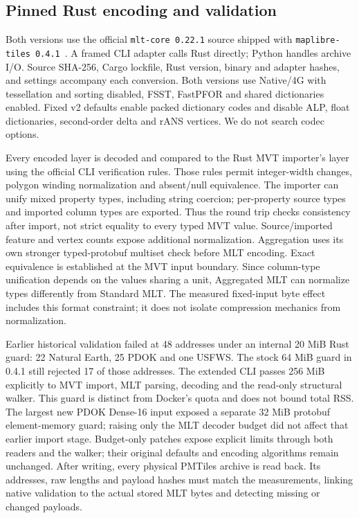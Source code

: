 \subsection{Pinned Rust encoding and validation}\label{sec:encoding}
Both versions use the official \texttt{mlt-core 0.22.1} source shipped with
\texttt{maplibre-tiles 0.4.1}~\citep{maplibre_tiles_py,maplibre_mlt_rust_pinned}.
A framed CLI adapter calls Rust directly; Python handles archive I/O. Source SHA-256,
Cargo lockfile, Rust version, binary and adapter hashes, and settings accompany each
conversion. Both versions use Native/4G with tessellation and sorting disabled,
FSST, FastPFOR and shared dictionaries enabled. Fixed v2 defaults enable packed
dictionary codes and disable ALP, float dictionaries, second-order delta and rANS
vertices. We do not search codec options.

Every encoded layer is decoded and compared to the Rust MVT importer's layer using
the official CLI verification rules. Those rules permit integer-width changes,
polygon winding normalization and absent/null equivalence. The importer can unify
mixed property types, including string coercion; per-property source types and
imported column types are exported. Thus the round trip checks consistency after
import, not strict equality to every typed MVT value. Source/imported feature and
vertex counts expose additional normalization. Aggregation uses its own stronger
typed-protobuf multiset check before MLT encoding.
Exact equivalence is established at the MVT input boundary. Since column-type
unification depends on the values sharing a unit, Aggregated MLT can normalize
types differently from Standard MLT. The measured fixed-input byte effect includes
this format constraint; it does not isolate compression mechanics from normalization.

Earlier historical validation failed at 48 addresses under an internal 20 MiB Rust
guard: 22 Natural Earth, 25 PDOK and one USFWS. The stock 64 MiB guard in 0.4.1
still rejected 17 of those addresses. The extended CLI passes 256 MiB explicitly
to MVT import, MLT parsing, decoding and the read-only structural walker. This guard
is distinct from Docker's quota and does not bound total RSS. The largest new
PDOK Dense-16 input exposed a separate 32 MiB protobuf element-memory guard;
raising only the MLT decoder budget did not affect that earlier import stage.
Budget-only patches expose explicit limits through both readers and the walker;
their original defaults and encoding algorithms remain unchanged.
After writing, every physical PMTiles archive is read back. Its addresses, raw
lengths and payload hashes must match the measurements, linking native validation
to the actual stored MLT bytes and detecting missing or changed payloads.

